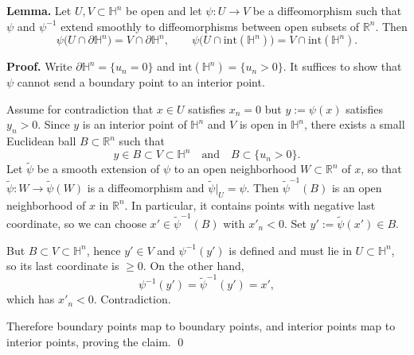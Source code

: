 \documentclass[12pt,a4paper]{article}
\theoremstyle{plain}
\theoremstyle{definition}      %
\begin{document}
\noindent\textbf{Lemma.}
Let $U,V\subset \mathbb{H}^n$ be open and let $\psi:U\to V$ be a diffeomorphism such that $\psi$ and $\psi^{-1}$
extend smoothly to diffeomorphisms between open subsets of $\mathbb{R}^n$.
Then
\[
\psi\bigl(U\cap \partial\mathbb{H}^n\bigr)=V\cap \partial\mathbb{H}^n,
\qquad
\psi\bigl(U\cap \mathrm{int}(\mathbb{H}^n)\bigr)=V\cap \mathrm{int}(\mathbb{H}^n).
\]

\medskip
\noindent\textbf{Proof.}
Write $\partial\mathbb{H}^n=\{u_n=0\}$ and $\mathrm{int}(\mathbb{H}^n)=\{u_n>0\}$.
It suffices to show that $\psi$ cannot send a boundary point to an interior point.

Assume for contradiction that $x\in U$ satisfies $x_n=0$ but $y:=\psi(x)$ satisfies $y_n>0$.
Since $y$ is an interior point of $\mathbb{H}^n$ and $V$ is open in $\mathbb{H}^n$, there exists a small Euclidean ball
$B\subset \mathbb{R}^n$ such that
\[
y\in B \subset V \subset \mathbb{H}^n
\quad\text{and}\quad
B\subset\{u_n>0\}.
\]
Let $\widetilde\psi$ be a smooth extension of $\psi$ to an open neighborhood $W\subset\mathbb{R}^n$ of $x$,
so that $\widetilde\psi:W\to \widetilde\psi(W)$ is a diffeomorphism and $\widetilde\psi|_U=\psi$.
Then $\widetilde\psi^{-1}(B)$ is an open neighborhood of $x$ in $\mathbb{R}^n$.
In particular, it contains points with negative last coordinate, so we can choose $x'\in \widetilde\psi^{-1}(B)$ with $x'_n<0$.
Set $y':=\widetilde\psi(x')\in B$.

But $B\subset V\subset\mathbb{H}^n$, hence $y'\in V$ and $\psi^{-1}(y')$ is defined and must lie in $U\subset\mathbb{H}^n$,
so its last coordinate is $\ge 0$. On the other hand,
\[
\psi^{-1}(y')=\widetilde\psi^{-1}(y')=x',
\]
which has $x'_n<0$. Contradiction.

Therefore boundary points map to boundary points, and interior points map to interior points, proving the claim.
\qed
\end{document}
